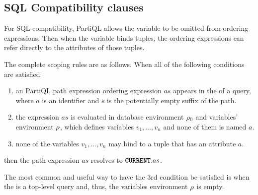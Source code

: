 \subsection{SQL Compatibility  clauses}
\label{sec:orderby-sql-compatibility}

For SQL-compatibility, PartiQL allows the  variable to be omitted
from ordering expressions. Then when the  variable binds tuples, the
ordering expressions can refer directly to the attributes of those tuples.



The complete scoping rules are as follows. When all of the following conditions
are satisfied:
\begin{enumerate}
\item an PartiQL path expression ordering expression $as$ appears in the
 of a  query, where $a$ is an identifier and
$s$ is the potentially empty suffix of the path.
\item the expression $as$ is evaluated in database environment $\rho_{0}$ and
variables' environment $\rho$, which defines variables $v_1,\ldots, v_n$ and
none of them is named $a$. 
\item none of the variables $v_1,\ldots, v_n$ may bind to a tuple that has an
attribute $a$.
\end{enumerate}
\noindent then the path expression $as$ resolves to $\texttt{\textbf{CURRENT}}.as$. 

The most common and useful way to have the 3rd condition be satisfied is when
the  is a top-level query and, thus, the variables
environment $\rho$ is empty.

